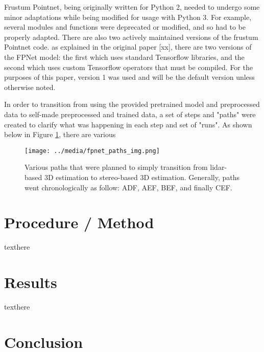 Frustum Pointnet, being originally written for Python 2, needed to undergo some minor adaptations while being modified for usage with Python 3. For example, several modules and functions were deprecated or modified, and so had to be properly adapted. There are also two actively maintained versions of the frustum Pointnet code. as explained in the original paper [xx], there are two versions of the FPNet model: the first which uses standard Tensorflow libraries, and the second which uses custom Tensorflow operators that must be compiled. For the purposes of this paper, version 1 was used and will be the default version unless otherwise noted. 

In order to transition from using the provided pretrained model and preprocessed data to self-made preprocessed and trained data, a set of steps and "paths" were created to clarify what was happening in each step and set of "runs". As shown below in Figure \ref{fp_paths}, there are various 

\begin{figure}[ht] %
    \texttt{[image: ../media/fpnet\_paths\_img.png]}
    \caption{Various paths that were planned to simply transition from lidar-based 3D estimation to stereo-based 3D estimation. Generally, paths went chronologically as follow: ADF, AEF, BEF, and finally CEF.}
    \label{fp_paths} %
\end{figure}



\section{Procedure / Method}
texthere

\section{Results}
texthere

\section{Conclusion}

